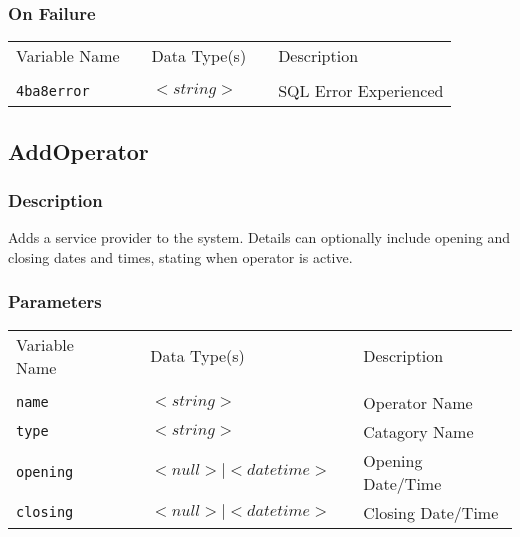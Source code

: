 \subsubsection{On Failure}

\begin{tabular}{lllll}
Variable Name	&		&	Data Type(s)		&	&	Description	\\
				&	&	&	&	\\
\verb!4ba8error! & \hspace{15mm} & $<string>$ & \hspace{15mm} & SQL Error Experienced \\
\end{tabular}


\subsection{AddOperator}

\subsubsection{Description}

Adds a service provider to the system. Details can optionally include
opening and closing dates and times, stating when operator is active.  

\subsubsection{Parameters}

\begin{tabular}{lllll}
Variable Name	&		&	Data Type(s)		&	&	Description	\\
				&	&	&	&	\\
\verb!name! & \hspace{15mm} & $<string>$ & \hspace{15mm} & Operator Name \\
\verb!type! & \hspace{15mm} & $<string>$ & \hspace{15mm} & Catagory Name \\
\verb!opening! & \hspace{15mm} & $<null> \mid <datetime>$ & \hspace{15mm} & Opening Date/Time \\
\verb!closing! & \hspace{15mm} & $<null> \mid <datetime>$ & \hspace{15mm} & Closing Date/Time \\
\end{tabular}

